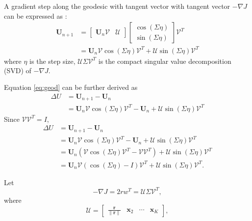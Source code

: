 A gradient step along the geodesic with tangent vector with tangent vector $-\nabla J$ can be expressed as \cite[]{edelman1988}:
\begin{equation}
\label{eq:geod}
\begin{split}
\mathbf{U}_{n+1} &= \left[\begin{array}{cc}
\mathbf{U}_{n}\mathcal{V} & \mathcal{U}
\end{array}\right] \left[\begin{array}{c}
\cos(\Sigma\eta) \\
\sin(\Sigma\eta)
 \end{array}\right]\mathcal{V}^T  \\
 &=\mathbf{U}_{n}\mathcal{V}\cos(\Sigma\eta)\mathcal{V}^T + \mathcal{U}\sin(\Sigma\eta)\mathcal{V}^T
 \end{split}
\end{equation}
where $\eta$ is the step size, $\mathcal{U}\Sigma\mathcal{V}^T$ is the compact singular value decomposition (SVD) of $-\nabla J$.

Equation \ref{eq:geod} can be further derived as
\begin{equation}
\label{eq:up}
\begin{split}
\Delta U &= \mathbf{U}_{n+1} - \mathbf{U}_{n}  \\
&=\mathbf{U}_{n}\mathcal{V}\cos(\Sigma\eta)\mathcal{V}^T-\mathbf{U}_{n} + \mathcal{U}\sin(\Sigma\eta)\mathcal{V}^T 
\end{split}
\end{equation}
Since $\mathcal{V}\mathcal{V}^T=I$, 
\begin{equation}
\label{eq:up2}
\begin{split}
\Delta U &= \mathbf{U}_{n+1} - \mathbf{U}_{n}  \\
&=\mathbf{U}_{n}\mathcal{V}\cos(\Sigma\eta)\mathcal{V}^T-\mathbf{U}_{n} + \mathcal{U}\sin(\Sigma\eta)\mathcal{V}^T \\
&=\mathbf{U}_{n}\left(\mathcal{V}\cos(\Sigma\eta)\mathcal{V}^T -\mathcal{V}\mathcal{V}^T\right) +\mathcal{U}\sin(\Sigma\eta)\mathcal{V}^T \\
&=\mathbf{U}_{n}\mathcal{V}\left(\cos(\Sigma\eta)-I\right)\mathcal{V}^T +\mathcal{U}\sin(\Sigma\eta)\mathcal{V}^T.
\end{split}
\end{equation}

Let 
\begin{equation}
\label{eq:svda}
-\nabla J = 2rw^T = \mathcal{U}\Sigma\mathcal{V}^T,
\end{equation}
where
\begin{equation}
\label{eq:u}
\mathcal{U}=\left[\begin{array}{cccc}
\frac{\mathbf{r}}{\parallel \mathbf{r} \parallel} & \mathbf{x}_2 & \cdots & \mathbf{x}_K 
\end{array} \right],
\end{equation}

